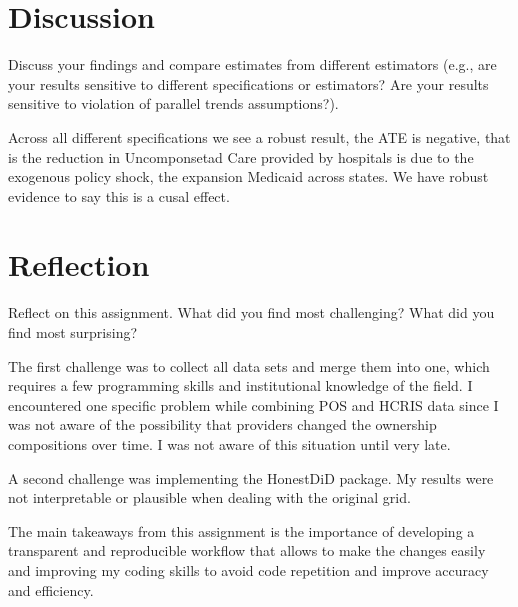 \documentclass[
  12pt,
]{article}
\begin{document}
\newpage

\hypertarget{discussion}{%
\section{Discussion}\label{discussion}}

Discuss your findings and compare estimates from different estimators
(e.g., are your results sensitive to different specifications or
estimators? Are your results sensitive to violation of parallel trends
assumptions?).

Across all different specifications we see a robust result, the ATE is
negative, that is the reduction in Uncomponsetad Care provided by
hospitals is due to the exogenous policy shock, the expansion Medicaid
across states. We have robust evidence to say this is a cusal effect.

\newpage

\hypertarget{reflection}{%
\section{Reflection}\label{reflection}}

Reflect on this assignment. What did you find most challenging? What did
you find most surprising?

The first challenge was to collect all data sets and merge them into
one, which requires a few programming skills and institutional knowledge
of the field. I encountered one specific problem while combining POS and
HCRIS data since I was not aware of the possibility that providers
changed the ownership compositions over time. I was not aware of this
situation until very late.

A second challenge was implementing the HonestDiD package. My results
were not interpretable or plausible when dealing with the original grid.

The main takeaways from this assignment is the importance of developing
a transparent and reproducible workflow that allows to make the changes
easily and improving my coding skills to avoid code repetition and
improve accuracy and efficiency.
\end{document}
